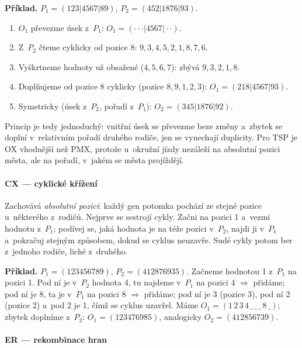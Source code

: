 \documentclass[11pt,a4paper]{article}
\theoremstyle{definition}
\begin{document}
\textbf{Příklad.} $P_1 = (123|4567|89)$, $P_2 = (452|1876|93)$.
\begin{enumerate}
\item $O_1$ převezme úsek z~$P_1$: $O_1 = ({\cdot}{\cdot}{\cdot}|4567|{\cdot}{\cdot})$.
\item Z~$P_2$ čteme cyklicky od pozice 8: $9,3,4,5,2,1,8,7,6$.
\item Vyškrtneme hodnoty už obsažené ($4,5,6,7$): zbývá $9,3,2,1,8$.
\item Doplňujeme od pozice 8 cyklicky (pozice $8,9,1,2,3$):
  $O_1 = (218|4567|93)$.
\item Symetricky (úsek z~$P_2$, pořadí z~$P_1$): $O_2 = (345|1876|92)$.
\end{enumerate}
Princip je tedy jednoduchý: vnitřní úsek se převezme beze změny a~zbytek se doplní
v~relativním pořadí druhého rodiče, jen se vynechají duplicity. Pro TSP je OX vhodnější
než PMX, protože u~okružní jízdy nezáleží na absolutní pozici města, ale na pořadí,
v~jakém se města projíždějí.

\paragraph{CX --- cyklické křížení}

\begin{defbox}
Zachovává \emph{absolutní pozici}: každý gen potomka pochází ze stejné pozice u~některého
z~rodičů. Nejprve se sestrojí cykly. Začni na pozici 1 a~vezmi hodnotu z~$P_1$; podívej
se, jaká hodnota je na téže pozici v~$P_2$, najdi ji v~$P_1$ a~pokračuj stejným způsobem,
dokud se cyklus neuzavře. Sudé cykly potom ber z~jednoho rodiče, liché z~druhého.
\end{defbox}

\textbf{Příklad.} $P_1 = (123456789)$, $P_2 = (412876935)$.
Začneme hodnotou 1 z~$P_1$ na pozici 1. Pod ní je v~$P_2$ hodnota 4, tu najdeme
v~$P_1$ na pozici 4 $\Rightarrow$ přidáme; pod ní je 8, ta je v~$P_1$ na pozici
8 $\Rightarrow$ přidáme; pod ní je 3 (pozice 3), pod ní 2 (pozice 2) a~pod 2 je
1, čímž se cyklus uzavřel. Máme
$O_1 = (1\,2\,3\,4\,\_\,\_\,\_\,8\,\_)$; zbytek doplníme z~$P_2$:
$O_1 = (123476985)$, analogicky $O_2 = (412856739)$.

\paragraph{ER --- rekombinace hran}
\end{document}
